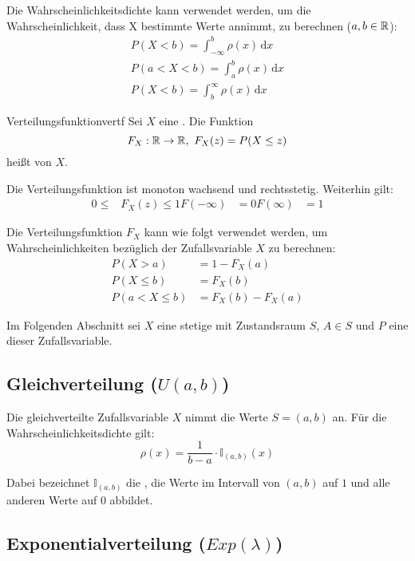 Die Wahrscheinlichkeitsdichte kann verwendet werden, um die Wahrscheinlichkeit,
dass X bestimmte Werte annimmt, zu berechnen ($a,b\in\mathbb{R}$):
\begin{align*}
  P(X < b) = \int_{-\infty}^{b}\rho(x)\,\mathrm{d}x\\
  P(a<X<b) = \int_{a}^{b}\rho(x)\,\mathrm{d}x\\
  P(X < b) = \int^{\infty}_{b}\rho(x)\,\mathrm{d}x
\end{align*}

\begin{definition}{Verteilungsfunktion}{vertf}
Sei $X$ eine . Die Funktion
\[F_X:\mathbb{R}\to\mathbb{R},\ F_X(z) = P(X \le z)\]
heißt  von $X$.
\end{definition}

Die Verteilungsfunktion ist monoton wachsend und rechtsstetig. Weiterhin gilt:
\begin{align*}
0\le &F_X(z)\le 1
F(-\infty) &= 0
F(\infty) &= 1
\end{align*}

Die Verteilungsfunktion $F_X$ kann wie folgt verwendet werden, um
Wahrscheinlichkeiten bezüglich der Zufallsvariable $X$ zu berechnen:
\begin{align*}
P(X>a) &= 1 - F_X(a) \\
P(X\le b) &= F_X(b) \\
P(a < X \le b) &= F_X(b) - F_X(a)
\end{align*}

Im Folgenden Abschnitt sei $X$ eine stetige 
mit Zustandsraum $S$, $A \in S$ und $P$ eine
 dieser Zufallsvariable.


\subsection{Gleichverteilung ($U(a,b)$)}

Die gleichverteilte Zufallsvariable $X$ nimmt die Werte $S=(a,b)$ an. Für die
Wahrscheinlichkeitsdichte gilt:
\[\rho(x) = \frac{1}{b-a}\cdot\mathbb{I}_{(a,b)}(x)\]

Dabei bezeichnet $\mathbb{I}_{(a,b)}$ die , die Werte im
Intervall von $(a,b)$ auf $1$ und alle anderen Werte auf $0$ abbildet.


\subsection{Exponentialverteilung ($Exp(\lambda)$)}

